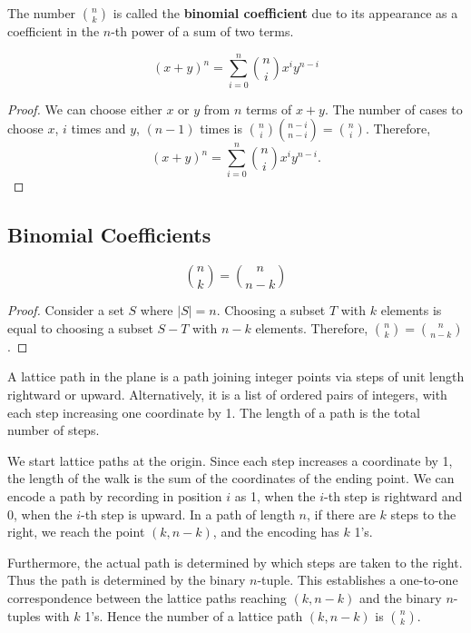 \documentclass[../main.tex]{subfiles}
\begin{document}
The number $n \choose k$ is called the \textbf{binomial coefficient} due to its appearance as a coefficient in the $n$-th power of a sum of two terms.
\begin{thm} 
    \[
        (x + y)^n = \sum_{i = 0}^n {n \choose i} x^i y^{n-i}
    \]
\end{thm}
\begin{proof}
    We can choose either $x$ or $y$ from $n$ terms of $x + y$.
    The number of cases to choose $x$, $i$ times and $y$, $(n-1)$ times is ${n \choose i}{n-i \choose n-i} = {n \choose i}$.
    Therefore,
    \[
        (x + y)^n = \sum_{i=0}^n {n \choose i} x^i y^{n-i}.
    \]
\end{proof}

\subsection{Binomial Coefficients}
\begin{lem}
    \[
        {n \choose k} = {n \choose n - k}
    \]
\end{lem}
\begin{proof}
    Consider a set $S$ where $|S| = n$.
    Choosing a subset $T$ with $k$ elements is equal to choosing a subset $S - T$ with $n - k$ elements.
    Therefore, ${n \choose k} = {n \choose n - k}$.
\end{proof}

\begin{defn}
    A \textsf{lattice path} in the plane is a path joining integer points via steps of unit length rightward or upward.
    Alternatively, it is a list of ordered pairs of integers, with each step increasing one coordinate by 1.
    The \textsf{length} of a path is the total number of steps.
\end{defn}

\begin{ex} 
    We start lattice paths at the origin.
    Since each step increases a coordinate by 1, the length of the walk is the sum of the coordinates of the ending point.
    We can encode a path by recording in position $i$ as 1, when the $i$-th step is rightward and 0, when the $i$-th step is upward.
    In a path of length $n$, if there are $k$ steps to the right, we reach the point $(k, n - k)$, and the encoding has $k$ 1's.

    Furthermore, the actual path is determined by which steps are taken to the right.
    Thus the path is determined by the binary $n$-tuple.
    This establishes a one-to-one correspondence between the lattice paths reaching $(k, n - k)$ and the binary $n$-tuples with $k$ 1's.
    Hence the number of a lattice path $(k, n - k)$ is $n \choose k$.
\end{ex}
\end{document}
